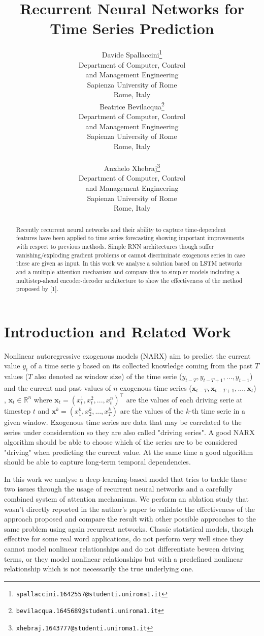 \documentclass{article}
\title{Recurrent Neural Networks for Time Series Prediction}
\author{
  Davide Spallaccini\thanks{\texttt{spallaccini.1642557@studenti.uniroma1.it}}
\\
  Department of Computer, Control \\ and Management Engineering\\
  Sapienza University of Rome\\
  Rome, Italy \\
  \And
  Beatrice Bevilacqua\thanks{\texttt{bevilacqua.1645689@studenti.uniroma1.it}}
\\
  Department of Computer, Control \\ and Management Engineering\\
  Sapienza University of Rome\\
  Rome, Italy \\
   \\
  \And
  Anxhelo Xhebraj\thanks{\texttt{xhebraj.1643777@studenti.uniroma1.it}} \\
  Department of Computer, Control \\ and Management Engineering\\
  Sapienza University of Rome\\
  Rome, Italy
}
\begin{document}

\maketitle

\begin{abstract}

Recently recurrent neural networks and their ability to capture time-dependent 
features have been applied to time series forecasting showing important 
improvements with respect to  previous methods. Simple RNN architectures though
suffer vanishing/exploding gradient problems or cannot discriminate exogenous series in case these are given as input. In this work we analyse a solution based on LSTM networks and a multiple attention mechanism and compare this to simpler models including a multistep-ahead encoder-decoder architecture to show the effectiveness of the method proposed by [1].

\end{abstract}

\section{Introduction and Related Work}
\label{sec:intro}

Nonlinear autoregressive exogenous models (NARX) aim to predict the current
value $y_t$ of a time serie $y$ based on its
collected knowledge coming from the past $T$ values ($T$ also denoted as window size) of
the time serie ($y_{t-T}, y_{t - T + 1}, ..., y_{t-1}$) and the current and past values of $n$
exogenous time series  ($\mathbf{x}_{t-T}, \mathbf{x}_{t - T + 1}, ..., \mathbf{x}_{t}$)
, $\mathbf{x}_t \in \mathbb{R}^n$ where $\mathbf{x}_t = (x_t^1, x_t^2, ..., x_t^n)^\top$
are the values of each driving serie at timestep $t$ and $\mathbf{x}^k =
(x_1^k, x_2^k, ..., x_T^k)$ are the values of the $k$-th time serie in a given
window. Exogenous time series
are data that may be correlated to the series under consideration so they are
also called "driving series". A good NARX algorithm should be able to choose which of the series are to be
considered "driving" when predicting the
current value. At the same time a good algorithm should be able to capture
long-term temporal dependencies.

In this work we analyse a deep-learning-based model that tries to tackle
these two issues through the usage of
recurrent neural networks and a carefully combined system of attention
mechanisms. We perform an ablation study that wasn't directly reported in the
author's paper to validate the effectiveness of the approach proposed and
compare the result with other possible approaches to the same problem using
again recurrent networks. 
Classic statistical models, though effective for some real word applications,
do not perform very well since they cannot
model nonlinear relationships and do not differentiate beween driving terms, or
they model nonlinear relationships
but with a predefined nonlinear relationship which is not necessarily the true
underlying one.
\end{document}
